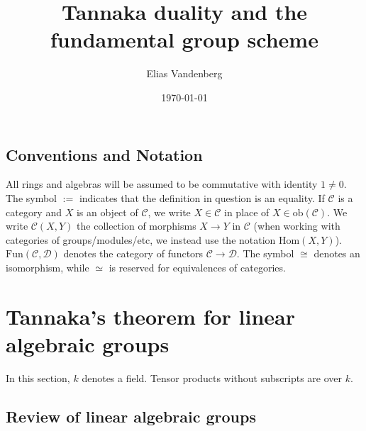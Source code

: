 \documentclass[10pt]{amsart}
\numberwithin{equation}{section}
\def\~#1{\mathscr{#1}}
\newcommand{\ob}{\mathrm{ob}}
\newcommand{\Hom}{\mathrm{Hom}}
\newcommand{\Fun}{\mathrm{Fun}}
\theoremstyle{plain}
\theoremstyle{definition}
\theoremstyle{remark}
\begin{document}
\title{Tannaka duality and the fundamental group scheme}


\author{Elias Vandenberg}
\address{Department of Mathematics, Western University}
\date{\today}

\maketitle

\tableofcontents


\subsection*{Conventions and Notation}
All rings and algebras will be assumed to be commutative with identity $1 \ne 0$. The symbol $:=$ indicates that the definition in question is an equality. If $\~C$ is a category and $X$ is an object of $\~C$, we write $X \in \~C$ in place of $X \in \ob(\~C)$. We write $\~C(X,Y)$ the collection of morphisms $X \to Y$ in $\~C$ (when working with categories of groups/modules/etc, we instead use the notation $\Hom(X,Y)$). $\Fun(\~C, \~D)$ denotes the category of functors $\~C \to \~D$. The symbol $\cong$ denotes an isomorphism, while $\simeq$ is reserved for equivalences of categories.



\section{Tannaka's theorem for linear algebraic groups} In this section, $k$ denotes a field. Tensor products without subscripts are over $k$.

\subsection{Review of linear algebraic groups}
\end{document}
